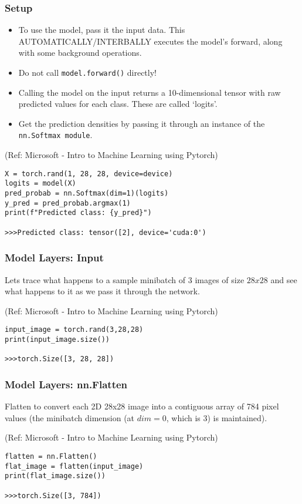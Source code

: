 \begin{frame}[fragile] \frametitle{Setup}

\begin{itemize}
\item To use the model, pass it the input data. This AUTOMATICALLY/INTERBALLY executes the model's forward, along with some background operations. 
\item Do not call \lstinline|model.forward()| directly!
\item Calling the model on the input returns a 10-dimensional tensor with raw predicted values for each class. These are called `logits'.
\item Get the prediction densities by passing it through an instance of the \lstinline|nn.Softmax module|.
\end{itemize}

\tiny{(Ref: Microsoft - Intro to Machine Learning using Pytorch)}

\begin{lstlisting}
X = torch.rand(1, 28, 28, device=device)
logits = model(X) 
pred_probab = nn.Softmax(dim=1)(logits)
y_pred = pred_probab.argmax(1)
print(f"Predicted class: {y_pred}")

>>>Predicted class: tensor([2], device='cuda:0')
\end{lstlisting}

\end{frame}

\begin{frame}[fragile] \frametitle{Model Layers: Input}

Lets trace what happens to a sample minibatch of 3 images of size $28x28$ and see what happens to it as we pass it through the network.

\tiny{(Ref: Microsoft - Intro to Machine Learning using Pytorch)}

\begin{lstlisting}
input_image = torch.rand(3,28,28)
print(input_image.size())

>>>torch.Size([3, 28, 28])
\end{lstlisting}

\end{frame}

\begin{frame}[fragile] \frametitle{Model Layers: nn.Flatten}

Flatten to convert each 2D 28x28 image into a contiguous array of 784 pixel values (the minibatch dimension (at $dim=0$, which is 3) is maintained).

\tiny{(Ref: Microsoft - Intro to Machine Learning using Pytorch)}

\begin{lstlisting}
flatten = nn.Flatten()
flat_image = flatten(input_image)
print(flat_image.size())

>>>torch.Size([3, 784])
\end{lstlisting}

\end{frame}

